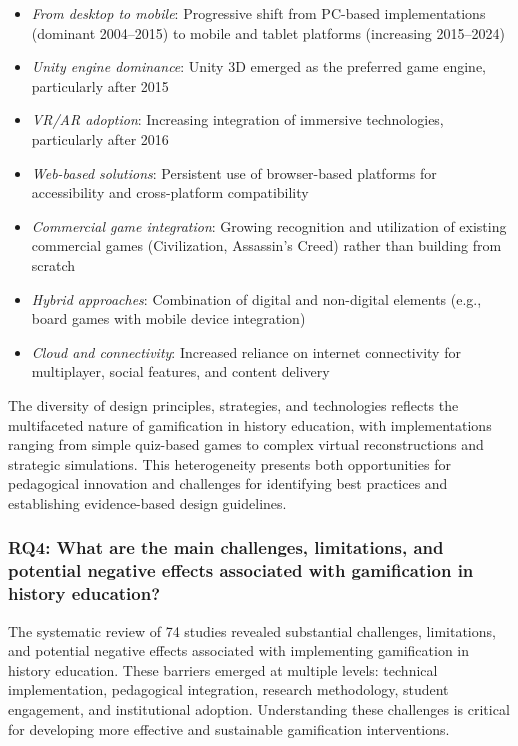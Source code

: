 \documentclass[a4paper,fleqn]{cas-sc}
\begin{document}
\begin{itemize}[noitemsep]
 \item \textit{From desktop to mobile}: Progressive shift from PC-based implementations (dominant 2004--2015) to mobile and tablet platforms (increasing 2015--2024)
 
 \item \textit{Unity engine dominance}: Unity 3D emerged as the preferred game engine, particularly after 2015
 
 \item \textit{VR/AR adoption}: Increasing integration of immersive technologies, particularly after 2016
 
 \item \textit{Web-based solutions}: Persistent use of browser-based platforms for accessibility and cross-platform compatibility
 
 \item \textit{Commercial game integration}: Growing recognition and utilization of existing commercial games (Civilization, Assassin's Creed) rather than building from scratch
 
 \item \textit{Hybrid approaches}: Combination of digital and non-digital elements (e.g., board games with mobile device integration)
 
 \item \textit{Cloud and connectivity}: Increased reliance on internet connectivity for multiplayer, social features, and content delivery
\end{itemize}

The diversity of design principles, strategies, and technologies reflects the multifaceted nature of gamification in history education, with implementations ranging from simple quiz-based games to complex virtual reconstructions and strategic simulations. This heterogeneity presents both opportunities for pedagogical innovation and challenges for identifying best practices and establishing evidence-based design guidelines.

\subsubsection{RQ4: What are the main challenges, limitations, and potential negative effects associated with gamification in history education?}

The systematic review of 74 studies revealed substantial challenges, limitations, and potential negative effects associated with implementing gamification in history education. These barriers emerged at multiple levels: technical implementation, pedagogical integration, research methodology, student engagement, and institutional adoption. Understanding these challenges is critical for developing more effective and sustainable gamification interventions.
\end{document}
